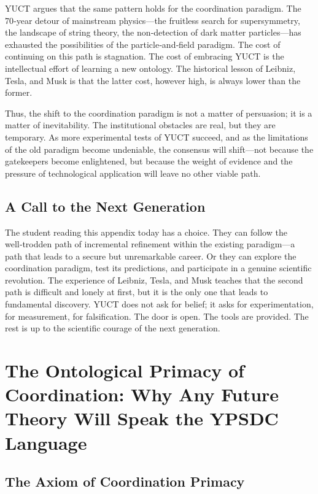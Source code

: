 \documentclass[12pt,a4paper]{article}
\begin{document}
	YUCT argues that the same pattern holds for the coordination paradigm. The 70‑year detour of mainstream physics—the fruitless search for supersymmetry, the landscape of string theory, the non‑detection of dark matter particles—has exhausted the possibilities of the particle‑and‑field paradigm. The cost of continuing on this path is stagnation. The cost of embracing YUCT is the intellectual effort of learning a new ontology. The historical lesson of Leibniz, Tesla, and Musk is that the latter cost, however high, is always lower than the former.
	
	Thus, the shift to the coordination paradigm is not a matter of persuasion; it is a matter of inevitability. The institutional obstacles are real, but they are temporary. As more experimental tests of YUCT succeed, and as the limitations of the old paradigm become undeniable, the consensus will shift—not because the gatekeepers become enlightened, but because the weight of evidence and the pressure of technological application will leave no other viable path.
	
	\subsection{A Call to the Next Generation}
	
	The student reading this appendix today has a choice. They can follow the well‑trodden path of incremental refinement within the existing paradigm—a path that leads to a secure but unremarkable career. Or they can explore the coordination paradigm, test its predictions, and participate in a genuine scientific revolution. The experience of Leibniz, Tesla, and Musk teaches that the second path is difficult and lonely at first, but it is the only one that leads to fundamental discovery. YUCT does not ask for belief; it asks for experimentation, for measurement, for falsification. The door is open. The tools are provided. The rest is up to the scientific courage of the next generation.
	
	\section{The Ontological Primacy of Coordination: Why Any Future Theory Will Speak the YPSDC Language}
	
	\subsection{The Axiom of Coordination Primacy}
	
\end{document}
